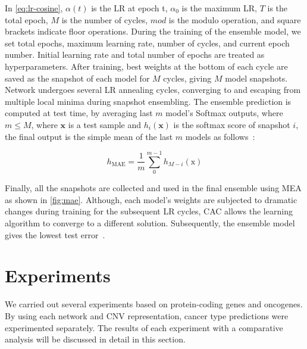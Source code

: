 \hspace*{3.5mm} In \cref{eq:lr-cosine}, $\alpha(t)$ is the LR at epoch t, $\alpha_0$ is the maximum LR, $T$ is the total epoch, $M$ is the number of cycles, $mod$ is the modulo operation, and square brackets indicate floor operations. During the training of the ensemble model, we set total epochs, maximum learning rate, number of cycles, and current epoch number. Initial learning rate and total number of epochs are treated as hyperparameters. After training, best weights at the bottom of each cycle are saved as the snapshot of each model for $M$ cycles, giving $M$ model snapshots. Network undergoes several LR annealing cycles, converging to and escaping from multiple local minima during snapshot ensembling. The ensemble prediction is computed at test time, by averaging last $m$ model's Softmax outputs, where $m \leq M$, where $\mathbf{x}$ is a test sample and $h_i \left(\mathbf{x} \right)$ is the softmax score of snapshot $i$, the final output is the simple mean of the last $m$ models as follows~\cite{huang2017snapshot}: 

\vspace{-2mm}
\begin{equation}
    h_{\mathrm{MAE}}=\frac{1}{m} \sum_{0}^{m-1} h_{M-i}(\mathrm{x})
    \label{eq:mae}
\end{equation}

\hspace*{3.5mm} Finally, all the snapshots are collected and used in the final ensemble using MEA as shown in \cref{fig:mae}. Although, each model's weights are subjected to dramatic changes during training for the subsequent LR cycles, CAC allows the learning algorithm to converge to a different solution. Subsequently, the ensemble model gives the lowest test error~\cite{huang2017snapshot}. %
\section{Experiments}\label{chapter_3:results}
We carried out several experiments based on protein-coding genes and oncogenes. By using each network and CNV representation, cancer type predictions were experimented separately. The results of each experiment with a comparative analysis will be discussed in detail in this section. 

